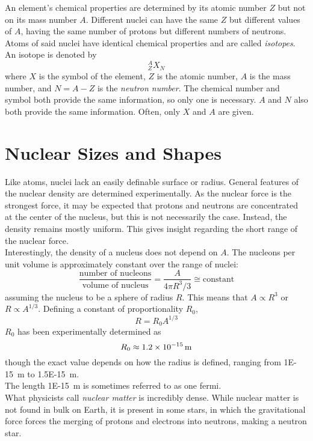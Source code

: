 \documentclass{subfiles}
\begin{document}
		An element's chemical properties are determined by its atomic number \(Z\) but not on its mass number \(A\). Different nuclei can have the same \(Z\) but different values of \(A\), having the same number of protons but different numbers of neutrons. Atoms of said nuclei have identical chemical properties and are called \textit{isotopes}. An isotope is denoted by
			\[^A_ZX_N\]
			where \(X\) is the symbol of the element, \(Z\) is the atomic number, \(A\) is the mass number, and \(N = A - Z\) is the \textit{neutron number}. The chemical number and symbol both provide the same information, so only one is necessary. \(A\) and \(N\) also both provide the same information. Often, only \(X\) and \(A\) are given.
	\section{Nuclear Sizes and Shapes}
		Like atoms, nuclei lack an easily definable surface or radius. General features of the nuclear density are determined experimentally. As the nuclear force is the strongest force, it may be expected that protons and neutrons are concentrated at the center of the nucleus, but this is not necessarily the case. Instead, the density remains mostly uniform. This gives insight regarding the short range of the nuclear force. \\
		Interestingly, the density of a nucleus does not depend on \(A\). The nucleons per unit volume is approximately constant over the range of nuclei:
			\[
				\frac{\text{number of nucleons}}{\text{volume of nucleus}} = \frac{A}{4\pi R^3/3}
					\cong \text{constant}
			\]
			assuming the nucleus to be a sphere of radius \(R\). This means that \(A \propto R^3\) or \(R \propto A^{1/3}\). Defining a constant of proportionality \(R_0\),
			\[R = R_0A^{1/3}\]
			\(R_0\) has been experimentally determined as
			\[R_0 \approx \SI{1.2E-15}{m}\]
			though the exact value depends on how the radius is defined, ranging from \SI{1E-15}{m} to \SI{1.5E-15}{m}. \\
			The length \SI{1E-15}{m} is sometimes referred to as one fermi. \\
		What physicists call \textit{nuclear matter} is incredibly dense. While nuclear matter is not found in bulk on Earth, it is present in some stars, in which the gravitational force forces the merging of protons and electrons into neutrons, making a neutron star.
\end{document}

